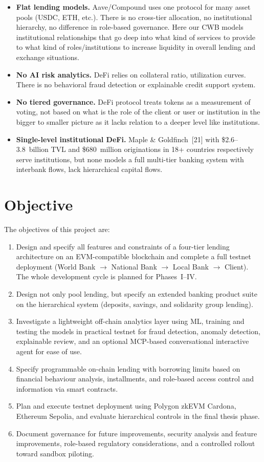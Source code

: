 \begin{itemize}[noitemsep]
\item \textbf{Flat lending models.} Aave/Compound uses one protocol for many asset pools (USDC, ETH, etc.). There is no cross-tier allocation, no institutional hierarchy, no difference in role-based governance. Here our CWB models institutional relationships that go deep into what kind of services to provide to what kind of roles/institutions to increase liquidity in overall lending and exchange situations.
\item \textbf{No AI risk analytics.} DeFi relies on collateral ratio, utilization curves. There is no behavioral fraud detection or explainable credit support system.
\item \textbf{No tiered governance.} DeFi protocol treats tokens as a measurement of voting, not based on what is the role of the client or user or institution in the bigger to smaller picture as it lacks relation to a deeper level like institutions.
\item \textbf{Single-level institutional DeFi.} Maple \& Goldfinch~[21] with \$2.6--3.8~billion TVL and \$680~million originations in 18+ countries respectively serve institutions, but none models a full multi-tier banking system with interbank flows, lack hierarchical capital flows.
\end{itemize}

\section{Objective}

The objectives of this project are:

\begin{enumerate}[noitemsep]
\item Design and specify all features and constraints of a four-tier lending architecture on an EVM-compatible blockchain and complete a full testnet deployment (World Bank $\to$ National Bank $\to$ Local Bank $\to$ Client). The whole development cycle is planned for Phases~I--IV.
\item Design not only pool lending, but specify an extended banking product suite on the hierarchical system (deposits, savings, and solidarity group lending).
\item Investigate a lightweight off-chain analytics layer using ML, training and testing the models in practical testnet for fraud detection, anomaly detection, explainable review, and an optional MCP-based conversational interactive agent for ease of use.
\item Specify programmable on-chain lending with borrowing limits based on financial behaviour analysis, installments, and role-based access control and information via smart contracts.
\item Plan and execute testnet deployment using Polygon zkEVM Cardona, Ethereum Sepolia, and evaluate hierarchical controls in the final thesis phase.
\item Document governance for future improvements, security analysis and feature improvements, role-based regulatory considerations, and a controlled rollout toward sandbox piloting.
\end{enumerate}


